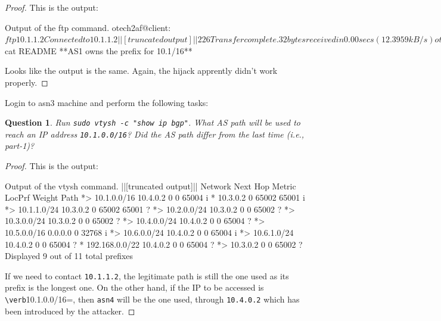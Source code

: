 \documentclass[a4paper,11pt,hidelinks]{article}
\newtheorem{theorem}{Question}[subsection]
\begin{document}
\begin{proof}
    This is the output:

\begin{code}{Output of the ftp command.}
otech2af@client:~$ ftp 10.1.1.2
Connected to 10.1.1.2
||[truncated output]||
226 Transfer complete. 32 bytes received in 0.00 secs (12.3959 kB/s)

otech2af@client:~$ cat README
**AS1 owns the prefix for 10.1/16**
\end{code}

    Looks like the output is the same. Again, the hijack apprently didn't work properly.
\end{proof}

Login to asn3 machine and perform the following tasks:

\begin{theorem}
    Run \verb=sudo vtysh -c "show ip bgp"=. What AS path will be used to reach an IP address \verb=10.1.0.0/16=? Did the AS path differ from the last time (i.e., part-1)?
\end{theorem}

\begin{proof}
    This is the output:

\begin{code}{Output of the vtysh command.}
||[truncated output]||
Network          Next Hop            Metric LocPrf Weight Path
*> 10.1.0.0/16      10.4.0.2                 0             0 65004 i
*                   10.3.0.2                               0 65002 65001 i
*> 10.1.1.0/24      10.3.0.2                               0 65002 65001 ?
*> 10.2.0.0/24      10.3.0.2                 0             0 65002 ?
*> 10.3.0.0/24      10.3.0.2                 0             0 65002 ?
*> 10.4.0.0/24      10.4.0.2                 0             0 65004 ?
*> 10.5.0.0/16      0.0.0.0                  0         32768 i
*> 10.6.0.0/24      10.4.0.2                 0             0 65004 i
*> 10.6.1.0/24      10.4.0.2                 0             0 65004 ?
*  192.168.0.0/22   10.4.0.2                 0             0 65004 ?
*>                  10.3.0.2                 0             0 65002 ?
Displayed  9 out of 11 total prefixes
\end{code}

    If we need to contact \verb=10.1.1.2=, the legitimate path is still the one used as its prefix is the longest one. On the other hand, if the IP to be accessed is \verb=\verb=10.1.0.0/16=, then \verb=asn4= will be the one used, through \verb=10.4.0.2= which has been introduced by the attacker.
\end{proof}
\end{document}
